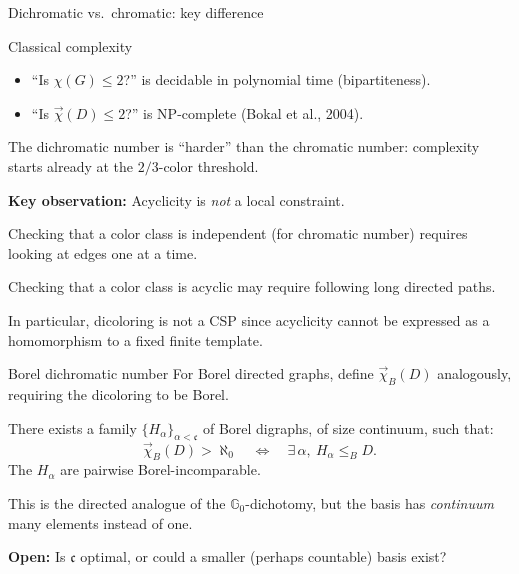 \documentclass[aspectratio=169, 12pt]{beamer}
\newcommand{\vchi}{\vec{\chi}_B}
\begin{document}
\begin{frame}{Dichromatic vs.\ chromatic: key difference}
\begin{block}{Classical complexity}
\begin{itemize}
	\item ``Is $\chi(G) \leq 2$?'' is decidable in polynomial time (bipartiteness).
	\item ``Is $\vec\chi(D) \leq 2$?'' is \alert{NP-complete} \quad (Bokal et al., 2004).
\end{itemize}
\end{block}

\medskip

The dichromatic number is ``harder'' than the chromatic number: complexity starts already at the $2/3$-color threshold.

\pause
\medskip

\textbf{Key observation:} Acyclicity is \emph{not} a local constraint.

Checking that a color class is independent (for chromatic number) requires looking at edges one at a time.

Checking that a color class is acyclic may require following long directed paths.

\medskip

In particular, dicoloring is \alert{not a CSP} since acyclicity cannot be expressed as a homomorphism to a fixed finite template.
\end{frame}

\begin{frame}{Borel dichromatic number}
For Borel directed graphs, define $\vchi(D)$ analogously, requiring the dicoloring to be Borel.

\medskip

\begin{theorem}
There exists a family $\{H_\alpha\}_{\alpha < \mathfrak{c}}$ of Borel digraphs, of size continuum, such that:
$$
\vchi(D) > \aleph_0
\quad\Longleftrightarrow\quad
\exists\, \alpha,\ H_\alpha \leq_B D.
$$
The $H_\alpha$ are pairwise Borel-incomparable.
\end{theorem}

\pause
\medskip

This is the directed analogue of the $\mathbb{G}_0$-dichotomy, but the basis has \emph{continuum} many elements instead of one.

\medskip

\textbf{Open:} Is $\mathfrak{c}$ optimal, or could a smaller (perhaps countable) basis exist?
\end{frame}
\end{document}
